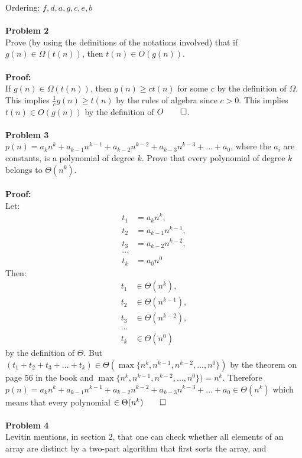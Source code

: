 \documentclass[11pt]{article}
\begin{document}
Ordering: $f, d, a, g, c, e, b$\\
\\
\noindent\textbf{Problem 2} \\
Prove (by using the definitions of the notations involved) that if 
$g(n) \in \Omega(t(n))$, then $t(n) \in O(g(n))$.\\
\\
\noindent\textbf{Proof:}\\
If $g(n) \in \Omega(t(n))$, then $g(n) \ge c t(n)$ for some $c$ by the
definition of $\Omega$. This implies $\frac {1}{c} g(n) \ge t(n)$ by
the rules of algebra since $c > 0$. This implies $t(n) \in O(g(n))$ by the
definition of $O \qed$. \\ 
\\
\noindent\textbf{Problem 3} \\
$p(n) = a_kn^k + a_{k-1}n^{k-1} + a_{k-2}n^{k-2} + a_{k-3}n^{k-3} + ... + 
a_0$, where the $a_i$ are constants, is a polynomial of degree $k$. 
Prove that every polynomial of degree $k$ belongs to $\Theta(n^k)$.
\\
\\
\noindent\textbf{Proof:}\\
Let: 
\begin{align*}
t_1 &= a_kn^k, \\
t_2 &= a_{k-1}n^{k-1}, \\
t_3 &= a_{k-2}n^{k-2}, \\ 
...\\
t_k &= a_0n^0
\end{align*}
Then:
\begin{align*}
t_1 &\in \Theta(n^k),\\
t_2 &\in \Theta(n^{k-1}),\\
t_3 &\in \Theta(n^{k-2}),\\
...\\
t_k &\in \Theta(n^0)
\end{align*}
by the definition of $\Theta$.
But $(t_1 + t_2 + t_3 + ... + t_k) \in \Theta(\max\{ n^k, n^{k-1}, n^{k-2},
..., n^0\})$ by the theorem on page $56$ in the book and 
$\max\{n^k, n^{k-1}, n^{k-2}, ..., n^0\}) = n^k.$ Therefore
$p(n) = a_kn^k + a_{k-1}n^{k-1} + a_{k-2}n^{k-2} + a_{k-3}n^{k-3} + ... +
a_0 \in \Theta(n^k)$ which means that every polynomial $\in \Theta(n^k) \qed$ 
\\
\\
\noindent\textbf{Problem 4} \\
Levitin mentions, in section 2, that one can check whether all elements of 
an array are distinct by a two-part algorithm that first sorts the array, and
\end{document}
